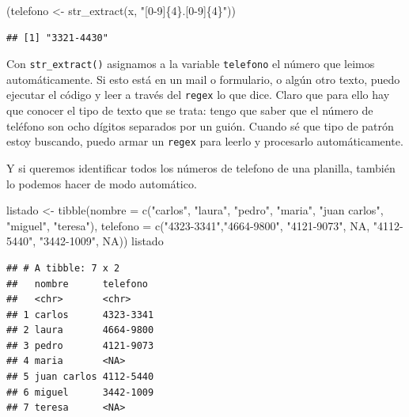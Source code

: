 \documentclass[
]{book}
\newenvironment{Shaded}{\begin{snugshade}}{\end{snugshade}}
\newcommand{\AttributeTok}[1]{\textcolor[rgb]{0.77,0.63,0.00}{#1}}
\newcommand{\ConstantTok}[1]{\textcolor[rgb]{0.00,0.00,0.00}{#1}}
\newcommand{\FunctionTok}[1]{\textcolor[rgb]{0.00,0.00,0.00}{#1}}
\newcommand{\NormalTok}[1]{#1}
\newcommand{\OtherTok}[1]{\textcolor[rgb]{0.56,0.35,0.01}{#1}}
\newcommand{\StringTok}[1]{\textcolor[rgb]{0.31,0.60,0.02}{#1}}
\begin{document}
\begin{Shaded}
\begin{Highlighting}[]
\NormalTok{(telefono }\OtherTok{\textless{}{-}} \FunctionTok{str\_extract}\NormalTok{(x, }\StringTok{"[0{-}9]\{4\}.[0{-}9]\{4\}"}\NormalTok{))}
\end{Highlighting}
\end{Shaded}

\begin{verbatim}
## [1] "3321-4430"
\end{verbatim}

Con \texttt{str\_extract()} asignamos a la variable \texttt{telefono} el número que leimos automáticamente. Si esto está en un mail o formulario, o algún otro texto, puedo ejecutar el código y leer a través del \texttt{regex} lo que dice. Claro que para ello hay que conocer el tipo de texto que se trata: tengo que saber que el número de teléfono son ocho dígitos separados por un guión. Cuando sé que tipo de patrón estoy buscando, puedo armar un \texttt{regex} para leerlo y procesarlo automáticamente.

Y si queremos identificar todos los números de telefono de una planilla, también lo podemos hacer de modo automático.

\begin{Shaded}
\begin{Highlighting}[]
\NormalTok{listado }\OtherTok{\textless{}{-}} \FunctionTok{tibble}\NormalTok{(}\AttributeTok{nombre =} \FunctionTok{c}\NormalTok{(}\StringTok{"carlos"}\NormalTok{, }\StringTok{"laura"}\NormalTok{, }\StringTok{"pedro"}\NormalTok{, }\StringTok{"maria"}\NormalTok{, }\StringTok{"juan carlos"}\NormalTok{, }\StringTok{"miguel"}\NormalTok{, }\StringTok{"teresa"}\NormalTok{),}
       \AttributeTok{telefono =} \FunctionTok{c}\NormalTok{(}\StringTok{"4323{-}3341"}\NormalTok{,}\StringTok{"4664{-}9800"}\NormalTok{, }\StringTok{"4121{-}9073"}\NormalTok{, }\ConstantTok{NA}\NormalTok{, }\StringTok{"4112{-}5440"}\NormalTok{, }\StringTok{"3442{-}1009"}\NormalTok{, }\ConstantTok{NA}\NormalTok{))}
\NormalTok{listado}
\end{Highlighting}
\end{Shaded}

\begin{verbatim}
## # A tibble: 7 x 2
##   nombre      telefono 
##   <chr>       <chr>    
## 1 carlos      4323-3341
## 2 laura       4664-9800
## 3 pedro       4121-9073
## 4 maria       <NA>     
## 5 juan carlos 4112-5440
## 6 miguel      3442-1009
## 7 teresa      <NA>
\end{verbatim}
\end{document}
